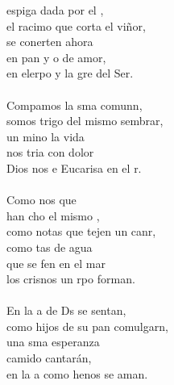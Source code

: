 \begin{cancion}%
	 espiga dada por el ,\\
	el racimo que corta el viñor,\\
	se conerten ahora\\
	en pan y o de amor,\\
	en elerpo y la gre del Ser.\\
\jump\\
	Compamos la sma comunn,\\
	somos trigo del mismo sembrar,\\
	un mino la vida \\
	nos tria con dolor\\
	Dios nos e Eucarisa en el r.\\
\jump\\
	Como nos que \\
	han cho el mismo ,\\
	como notas que tejen un canr,\\
	como tas de agua \\
	que se fen en el mar\\
	los crisnos un rpo forman.\\
\jump\\
	En la a de Ds se sentan,\\
	como hijos de su pan comulgarn,\\
	una sma esperanza \\
	camido cantarán,\\
	en la a como henos se aman.\\
\end{cancion}%
